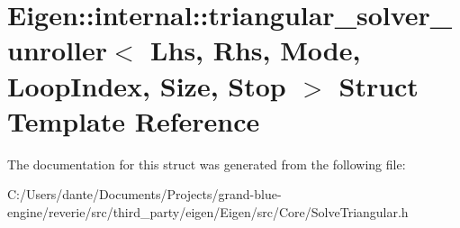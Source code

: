 \hypertarget{struct_eigen_1_1internal_1_1triangular__solver__unroller}{}\section{Eigen\+::internal\+::triangular\+\_\+solver\+\_\+unroller$<$ Lhs, Rhs, Mode, Loop\+Index, Size, Stop $>$ Struct Template Reference}
\label{struct_eigen_1_1internal_1_1triangular__solver__unroller}


The documentation for this struct was generated from the following file\+:\begin{DoxyCompactItemize}
\item 
C\+:/\+Users/dante/\+Documents/\+Projects/grand-\/blue-\/engine/reverie/src/third\+\_\+party/eigen/\+Eigen/src/\+Core/Solve\+Triangular.\+h\end{DoxyCompactItemize}
